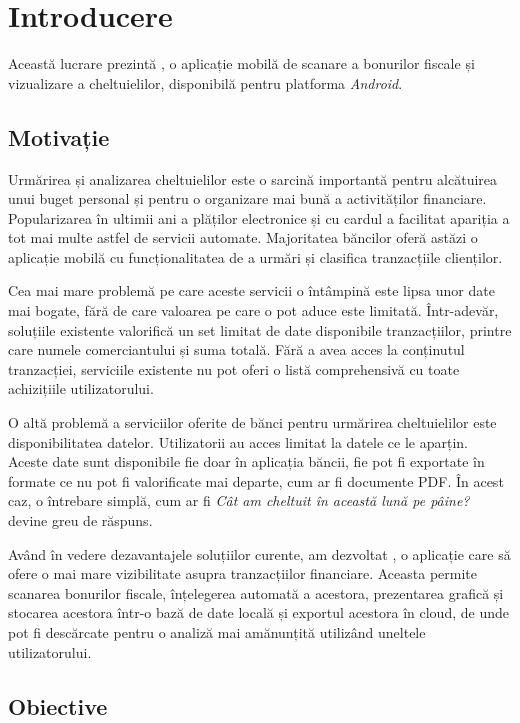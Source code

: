\chapter{Introducere}\label{introducere}

Această lucrare prezintă \AppNameB, o aplicație mobilă de scanare a bonurilor fiscale și vizualizare a cheltuielilor, disponibilă pentru platforma \emph{Android}.

\section{Motivație}

Urmărirea și analizarea cheltuielilor este o sarcină importantă pentru alcătuirea unui buget personal și pentru o organizare mai bună a activităților financiare. Popularizarea în ultimii ani a plăților electronice și cu cardul a facilitat apariția a tot mai multe astfel de servicii automate. Majoritatea băncilor oferă astăzi o aplicație mobilă cu funcționalitatea de a urmări și clasifica tranzacțiile clienților.

Cea mai mare problemă pe care aceste servicii o întâmpină este lipsa unor date mai bogate, fără de care valoarea pe care o pot aduce este limitată. Într-adevăr, soluțiile existente valorifică un set limitat de date disponibile tranzacțiilor, printre care numele comerciantului și suma totală. Fără a avea acces la conținutul tranzacției, serviciile existente nu pot oferi o listă comprehensivă cu toate achizițiile utilizatorului.

O altă problemă a serviciilor oferite de bănci pentru urmărirea cheltuielilor este disponibilitatea datelor. Utilizatorii au acces limitat la datele ce le aparțin. Aceste date sunt disponibile fie doar în aplicația băncii, fie pot fi exportate în formate ce nu pot fi valorificate mai departe, cum ar fi documente PDF. În acest caz, o întrebare simplă, cum ar fi \textit{Cât am cheltuit în această lună pe pâine?} devine greu de răspuns.

Având în vedere dezavantajele soluțiilor curente, am dezvoltat \AppName, o aplicație care să ofere o mai mare vizibilitate asupra tranzacțiilor financiare. Aceasta permite scanarea bonurilor fiscale, înțelegerea automată a acestora, prezentarea grafică și stocarea acestora într-o bază de date locală și exportul acestora în cloud, de unde pot fi descărcate pentru o analiză mai amănunțită utilizând uneltele utilizatorului.

\section{Obiective}

